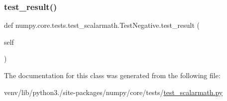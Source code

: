 \mbox{\label{classnumpy_1_1core_1_1tests_1_1test__scalarmath_1_1TestNegative_acae072290af9336c3db82ba5dbfe51cd}} 
\subsubsection{\texorpdfstring{test\+\_\+result()}{test\_result()}}
{\footnotesize\ttfamily def numpy.\+core.\+tests.\+test\+\_\+scalarmath.\+Test\+Negative.\+test\+\_\+result (\begin{DoxyParamCaption}\item[{}]{self }\end{DoxyParamCaption})}



The documentation for this class was generated from the following file\+:\begin{DoxyCompactItemize}
\item 
venv/lib/python3./site-\/packages/numpy/core/tests/\hyperlink{test__scalarmath_8py}{test\+\_\+scalarmath.\+py}\end{DoxyCompactItemize}
